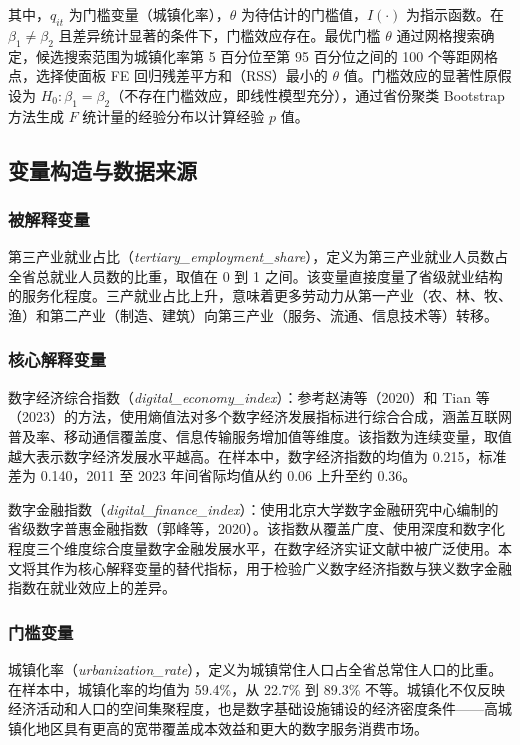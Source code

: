 其中，$q_{it}$ 为门槛变量（城镇化率），$\theta$ 为待估计的门槛值，$I(\cdot)$ 为指示函数。在 $\beta_1 \neq \beta_2$ 且差异统计显著的条件下，门槛效应存在。最优门槛 $\theta$ 通过网格搜索确定，候选搜索范围为城镇化率第 5 百分位至第 95 百分位之间的 100 个等距网格点，选择使面板 FE 回归残差平方和（RSS）最小的 $\theta$ 值。门槛效应的显著性原假设为 $H_0: \beta_1 = \beta_2$（不存在门槛效应，即线性模型充分），通过省份聚类 Bootstrap 方法生成 $F$ 统计量的经验分布以计算经验 $p$ 值。

\subsection{变量构造与数据来源}

\subsubsection{被解释变量}

第三产业就业占比（\textit{tertiary\_employment\_share}），定义为第三产业就业人员数占全省总就业人员数的比重，取值在 0 到 1 之间。该变量直接度量了省级就业结构的服务化程度。三产就业占比上升，意味着更多劳动力从第一产业（农、林、牧、渔）和第二产业（制造、建筑）向第三产业（服务、流通、信息技术等）转移。

\subsubsection{核心解释变量}

数字经济综合指数（\textit{digital\_economy\_index}）：参考赵涛等（2020）和 Tian 等（2023）的方法，使用熵值法对多个数字经济发展指标进行综合合成，涵盖互联网普及率、移动通信覆盖度、信息传输服务增加值等维度。该指数为连续变量，取值越大表示数字经济发展水平越高。在样本中，数字经济指数的均值为 0.215，标准差为 0.140，2011 至 2023 年间省际均值从约 0.06 上升至约 0.36。

数字金融指数（\textit{digital\_finance\_index}）：使用北京大学数字金融研究中心编制的省级数字普惠金融指数（郭峰等，2020）。该指数从覆盖广度、使用深度和数字化程度三个维度综合度量数字金融发展水平，在数字经济实证文献中被广泛使用。本文将其作为核心解释变量的替代指标，用于检验广义数字经济指数与狭义数字金融指数在就业效应上的差异。

\subsubsection{门槛变量}

城镇化率（\textit{urbanization\_rate}），定义为城镇常住人口占全省总常住人口的比重。在样本中，城镇化率的均值为 59.4\%，从 22.7\% 到 89.3\% 不等。城镇化不仅反映经济活动和人口的空间集聚程度，也是数字基础设施铺设的经济密度条件——高城镇化地区具有更高的宽带覆盖成本效益和更大的数字服务消费市场。

